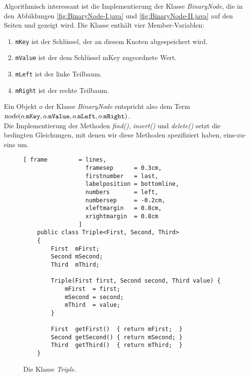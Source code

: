 Algorithmisch interessant ist die Implementierung der Klasse \textsl{BinaryNode}, die in den
Abbildungen \ref{fig:BinaryNode-I.java} und \ref{fig:BinaryNode-II.java} auf den Seiten 
\pageref{fig:BinaryNode-I.java} und \pageref{fig:BinaryNode-II.java} gezeigt wird.
Die Klasse enth\"alt vier Member-Variablen:
\begin{enumerate}
\item \texttt{mKey} ist der Schl\"ussel, der an diesem Knoten abgespeichert wird.
\item \texttt{mValue} ist der dem Schl\"ussel \textrm{mKey} zugeordnete Wert.
\item \texttt{mLeft} ist der linke Teilbaum.
\item \texttt{mRight} ist der rechte Teilbaum.
\end{enumerate}
Ein Objekt $o$ der Klasse \textsl{BinaryNode} entspricht also dem Term \\[0.1cm]
\hspace*{1.3cm} 
$\textsl{node}(o.\texttt{mKey}, o.\texttt{mValue}, o.\texttt{mLeft}, o.\texttt{mRight})$. 
\\[0.1cm]
Die Implementierung der Methoden \textsl{find()}, \textsl{insert()} und \textsl{delete()} setzt die bedingten
Gleichungen, mit denen wir diese Methoden spezifiziert haben, eins-zu-eins um.

\begin{figure}[!ht]
  \centering
\begin{Verbatim}[ frame         = lines, 
                  framesep      = 0.3cm, 
                  firstnumber   = last,
                  labelposition = bottomline,
                  numbers       = left,
                  numbersep     = -0.2cm,
                  xleftmargin   = 0.8cm,
                  xrightmargin  = 0.8cm
                ]
    public class Triple<First, Second, Third>
    {
        First  mFirst;
        Second mSecond;
        Third  mThird;
        
        Triple(First first, Second second, Third value) {
            mFirst  = first;
            mSecond = second;
            mThird  = value;
        }
    
        First  getFirst()  { return mFirst;  }
        Second getSecond() { return mSecond; }
        Third  getThird()  { return mThird;  }
    }
\end{Verbatim}
\vspace*{-0.3cm}
  \caption{Die Klasse \textsl{Triple}.}
  \label{fig:Triple.java}
\end{figure}


